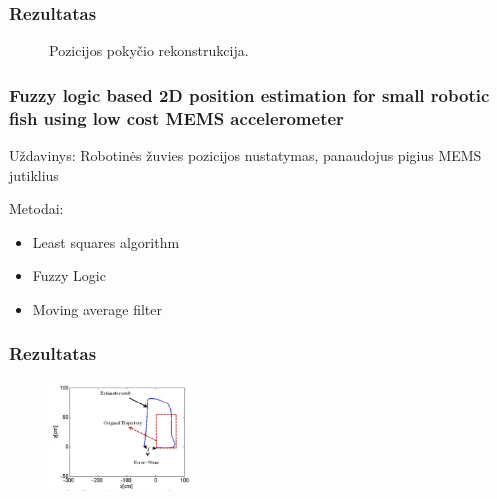 \documentclass{beamer}
\begin{document}
    \begin{frame}
        \frametitle{Rezultatas}

        \begin{figure}[H]
            \centering
            \caption{Pozicijos pokyčio rekonstrukcija.}
        \end{figure}
    \end{frame}

    \begin{frame}
        \frametitle{Fuzzy logic based 2D position estimation for small robotic fish using low cost MEMS accelerometer \cite{yoo2011fuzzy}}

        Uždavinys: Robotinės žuvies pozicijos nustatymas, panaudojus pigius MEMS jutiklius

        Metodai:
        \begin{itemize}
            \item Least squares algorithm
            \item Fuzzy Logic
            \item Moving average filter
        \end{itemize}
    \end{frame}

    \begin{frame}
        \frametitle{Rezultatas}

        \begin{figure}[H]
            \centering
            \includegraphics[width=150px]{img/yoo2011_calibrated.png}
        \end{figure}
    \end{frame}
\end{document}
